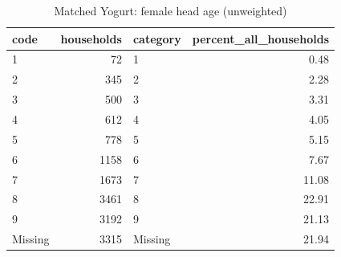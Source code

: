 \begin{table}
\caption{Matched Yogurt: female head age (unweighted)}
\begin{tabular}{lrlr}
\toprule
code & households & category & percent\_all\_households \\
\midrule
1 & 72 & 1 & 0.48 \\
2 & 345 & 2 & 2.28 \\
3 & 500 & 3 & 3.31 \\
4 & 612 & 4 & 4.05 \\
5 & 778 & 5 & 5.15 \\
6 & 1158 & 6 & 7.67 \\
7 & 1673 & 7 & 11.08 \\
8 & 3461 & 8 & 22.91 \\
9 & 3192 & 9 & 21.13 \\
Missing & 3315 & Missing & 21.94 \\
\bottomrule
\end{tabular}
\end{table}
